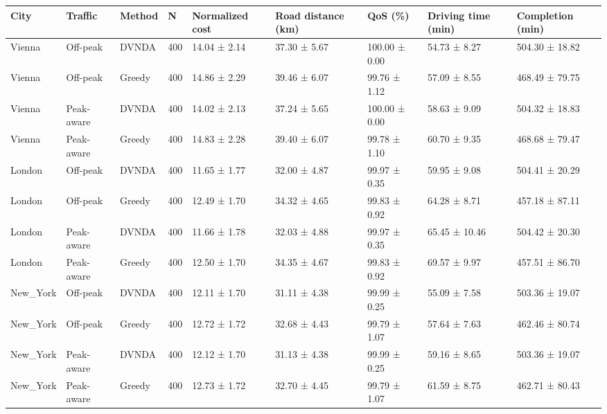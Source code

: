 \begin{tabular}{lllllllll}
\hline
City & Traffic & Method & N & Normalized cost & Road distance (km) & QoS (\%) & Driving time (min) & Completion (min) \\
\hline
Vienna & Off-peak & DVNDA & 400 & 14.04 ± 2.14 & 37.30 ± 5.67 & 100.00 ± 0.00 & 54.73 ± 8.27 & 504.30 ± 18.82 \\
Vienna & Off-peak & Greedy & 400 & 14.86 ± 2.29 & 39.46 ± 6.07 & 99.76 ± 1.12 & 57.09 ± 8.55 & 468.49 ± 79.75 \\
Vienna & Peak-aware & DVNDA & 400 & 14.02 ± 2.13 & 37.24 ± 5.65 & 100.00 ± 0.00 & 58.63 ± 9.09 & 504.32 ± 18.83 \\
Vienna & Peak-aware & Greedy & 400 & 14.83 ± 2.28 & 39.40 ± 6.07 & 99.78 ± 1.10 & 60.70 ± 9.35 & 468.68 ± 79.47 \\
London & Off-peak & DVNDA & 400 & 11.65 ± 1.77 & 32.00 ± 4.87 & 99.97 ± 0.35 & 59.95 ± 9.08 & 504.41 ± 20.29 \\
London & Off-peak & Greedy & 400 & 12.49 ± 1.70 & 34.32 ± 4.65 & 99.83 ± 0.92 & 64.28 ± 8.71 & 457.18 ± 87.11 \\
London & Peak-aware & DVNDA & 400 & 11.66 ± 1.78 & 32.03 ± 4.88 & 99.97 ± 0.35 & 65.45 ± 10.46 & 504.42 ± 20.30 \\
London & Peak-aware & Greedy & 400 & 12.50 ± 1.70 & 34.35 ± 4.67 & 99.83 ± 0.92 & 69.57 ± 9.97 & 457.51 ± 86.70 \\
New\_York & Off-peak & DVNDA & 400 & 12.11 ± 1.70 & 31.11 ± 4.38 & 99.99 ± 0.25 & 55.09 ± 7.58 & 503.36 ± 19.07 \\
New\_York & Off-peak & Greedy & 400 & 12.72 ± 1.72 & 32.68 ± 4.43 & 99.79 ± 1.07 & 57.64 ± 7.63 & 462.46 ± 80.74 \\
New\_York & Peak-aware & DVNDA & 400 & 12.12 ± 1.70 & 31.13 ± 4.38 & 99.99 ± 0.25 & 59.16 ± 8.65 & 503.36 ± 19.07 \\
New\_York & Peak-aware & Greedy & 400 & 12.73 ± 1.72 & 32.70 ± 4.45 & 99.79 ± 1.07 & 61.59 ± 8.75 & 462.71 ± 80.43 \\
\hline
\end{tabular}
